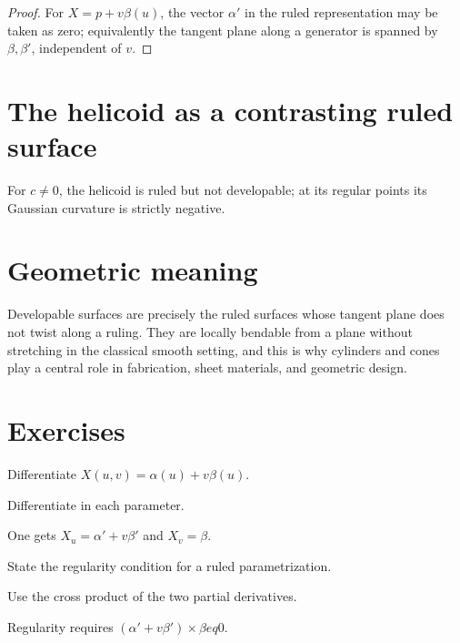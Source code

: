 \begin{proof}
For \(X=p+v\beta(u)\), the vector \(\alpha'\) in the ruled representation may be taken as zero; equivalently the tangent plane along a generator is spanned by \(\beta,\beta'\), independent of \(v\).
\end{proof}

\section{The helicoid as a contrasting ruled surface}

\begin{proposition}\label{prop:vii18-helicoid-not}
For \(c\neq0\), the helicoid is ruled but not developable; at its regular points its Gaussian curvature is strictly negative.
\end{proposition}

\section{Geometric meaning}

Developable surfaces are precisely the ruled surfaces whose tangent plane does not twist along a ruling. They are locally bendable from a plane without stretching in the classical smooth setting, and this is why cylinders and cones play a central role in fabrication, sheet materials, and geometric design.

\section{Exercises}
\begin{exercise}\label{exr:vii18-01}
Differentiate \(X(u,v)=\alpha(u)+v\beta(u)\).
\end{exercise}
\begin{hint}
Differentiate in each parameter.
\end{hint}
\begin{solution}
One gets \(X_u=\alpha'+v\beta'\) and \(X_v=\beta\).
\end{solution}

\begin{exercise}\label{exr:vii18-02}
State the regularity condition for a ruled parametrization.
\end{exercise}
\begin{hint}
Use the cross product of the two partial derivatives.
\end{hint}
\begin{solution}
Regularity requires \((\alpha'+v\beta')\times\beta
eq0\).
\end{solution}

